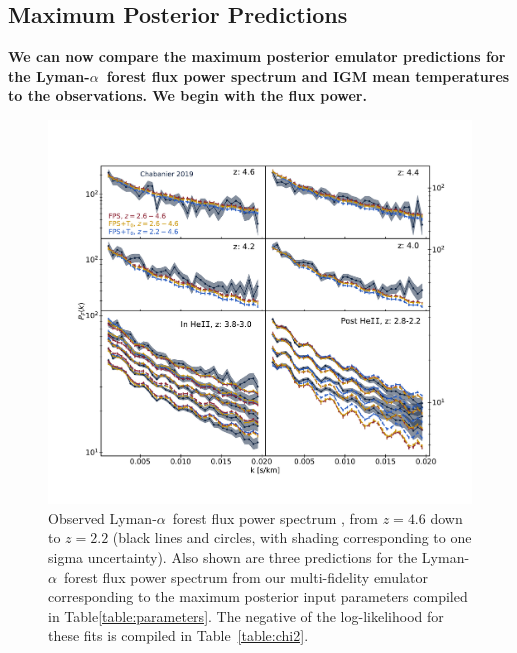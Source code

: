 \documentclass[a4paper,11pt]{article}
\newcommand{\lya}{Lyman-$\alpha$\ }
\begin{document}

\subsection{Maximum Posterior Predictions}\label{sec:obs_fits}

\textbf{We can now compare the maximum posterior emulator predictions for the \lya forest flux power spectrum and IGM mean temperatures to the observations.
We begin with the flux power.}

\begin{figure}
    \centering
    \includegraphics[width=\textwidth]{figures/fps_data_fit.pdf}
    \caption{\label{fig:fps_data}
    Observed \lya forest flux power spectrum \cite{2019JCAP...07..017C}, from $z=4.6$ down to $z=2.2$ (black lines and circles, with shading corresponding to one sigma uncertainty).
    Also shown are three predictions for the \lya forest flux power spectrum from our multi-fidelity emulator corresponding to the maximum posterior input parameters compiled in Table\ref{table:parameters}.
    The negative of the log-likelihood for these fits is compiled in Table~\ref{table:chi2}.
    }
\end{figure}
\end{document}
